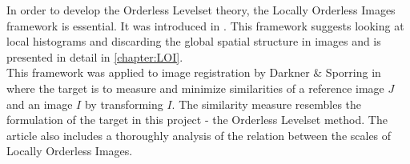 In order to develop the Orderless Levelset theory, the Locally Orderless Images framework is essential. It was introduced in \cite{griffin.97, koe.99}. This framework suggests looking at local histograms and discarding the global spatial structure in images and is presented in detail in \cref{chapter:LOI}.\\
This framework was applied to image registration by Darkner \& Sporring in \cite{dar.11,dar.12} where the target is to measure and minimize similarities of a reference image $J$ and an image $I$ by transforming $I$. The similarity measure resembles the formulation of the target in this project - the Orderless Levelset method. The article also includes a thoroughly analysis of the relation between the scales of Locally Orderless Images.